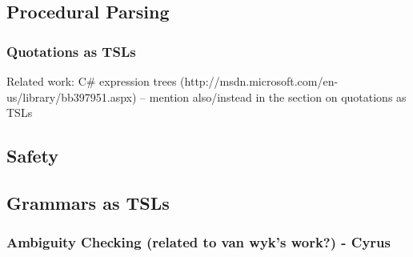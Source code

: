 \subsection{Procedural Parsing}
\subsubsection{Quotations as TSLs}
Related work: C\# expression trees (http://msdn.microsoft.com/en-us/library/bb397951.aspx) -- mention also/instead in the section on quotations as TSLs

\subsection{Safety}
\subsection{Grammars as TSLs}
\subsubsection{Ambiguity Checking (related to van wyk's work?) - Cyrus}


